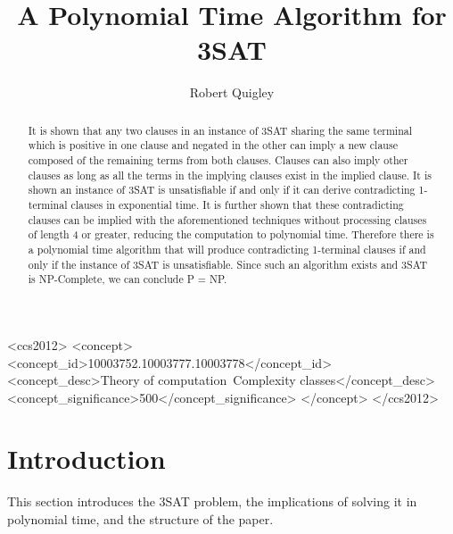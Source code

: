 \documentclass[manuscript]{acmart}
\begin{document}
    \title{A Polynomial Time Algorithm for 3SAT} 
    \author{Robert Quigley}

    \begin{abstract}
        It is shown that any two clauses in an instance of 3SAT sharing the same terminal which is positive in one clause and negated in the other can imply a new clause composed of the remaining terms from both clauses. Clauses can also imply other clauses as long as all the terms in the implying clauses exist in the implied clause. It is shown an instance of 3SAT is unsatisfiable if and only if it can derive contradicting 1-terminal clauses in exponential time. It is further shown that these contradicting clauses can be implied with the aforementioned techniques without processing clauses of length 4 or greater, reducing the computation to polynomial time. Therefore there is a polynomial time algorithm that will produce contradicting 1-terminal clauses if and only if the instance of 3SAT is unsatisfiable. Since such an algorithm exists and 3SAT is NP-Complete, we can conclude P = NP.
    \end{abstract}
    
    
\begin{CCSXML}
        <ccs2012>
           <concept>
               <concept_id>10003752.10003777.10003778</concept_id>
               <concept_desc>Theory of computation~Complexity classes</concept_desc>
               <concept_significance>500</concept_significance>
               </concept>
        </ccs2012>
\end{CCSXML}
        
    
    \maketitle 
    
    \section{Introduction}

        This section introduces the 3SAT problem, the implications of
        solving it in polynomial time, and the structure of the paper.
\end{document}
